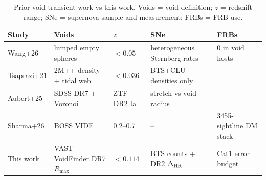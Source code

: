 \begin{table}
\caption{Prior void-transient work vs this work. Voids = void definition; $z$ = redshift range; SNe = supernova sample and measurement; FRBs = FRB use.}
\label{tab:prior}
{\small\setlength{\tabcolsep}{4pt}
\begin{tabular}{lllll}
\hline
Study & Voids & $z$ & SNe & FRBs \\
\hline
Wang+26 & lumped empty spheres & $<0.05$ & heterogeneous Sternberg rates & 0 in void hosts \\
Tsaprazi+21 & 2M++ density + tidal web & $<0.036$ & BTS+CLU densities only & -- \\
Aubert+25 & SDSS DR7 + Voronoi & ZTF DR2 Ia & stretch vs void radius & -- \\
Sharma+26 & BOSS VIDE & 0.2--0.7 & -- & 3455-sightline DM stack \\
This work & VAST VoidFinder DR7 $R_{\max}$ & $<0.114$ & BTS counts + DR2 $\Delta_{\rm HR}$ & Cat1 error budget \\
\hline
\end{tabular}}
\end{table}

